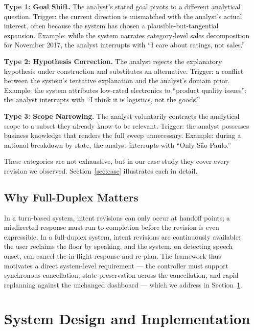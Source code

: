 \documentclass[journal]{IEEEtran}
\begin{document}
\textbf{Type 1: Goal Shift.} The analyst's stated goal pivots to a different analytical question. Trigger: the current direction is mismatched with the analyst's actual interest, often because the system has chosen a plausible-but-tangential expansion. Example: while the system narrates category-level sales decomposition for November 2017, the analyst interrupts with ``I care about ratings, not sales.''

\textbf{Type 2: Hypothesis Correction.} The analyst rejects the explanatory hypothesis under construction and substitutes an alternative. Trigger: a conflict between the system's tentative explanation and the analyst's domain prior. Example: the system attributes low-rated electronics to ``product quality issues''; the analyst interrupts with ``I think it is logistics, not the goods.''

\textbf{Type 3: Scope Narrowing.} The analyst voluntarily contracts the analytical scope to a subset they already know to be relevant. Trigger: the analyst possesses business knowledge that renders the full sweep unnecessary. Example: during a national breakdown by state, the analyst interrupts with ``Only S\~ao Paulo.''

These categories are not exhaustive, but in our case study they cover every revision we observed. Section~\ref{sec:case} illustrates each in detail.

\subsection{Why Full-Duplex Matters}
In a turn-based system, intent revisions can only occur at handoff points; a misdirected response must run to completion before the revision is even expressible. In a full-duplex system, intent revisions are continuously available: the user reclaims the floor by speaking, and the system, on detecting speech onset, can cancel the in-flight response and re-plan. The framework thus motivates a direct system-level requirement --- the controller must support synchronous cancellation, state preservation across the cancellation, and rapid replanning against the unchanged dashboard --- which we address in Section~\ref{sec:system}.

\section{System Design and Implementation}
\label{sec:system}
\end{document}
